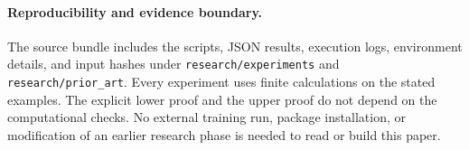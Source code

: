 \paragraph{Reproducibility and evidence boundary.}
The source bundle includes the scripts, JSON results, execution logs,
environment details, and input hashes under
\texttt{research/experiments} and \texttt{research/prior\_art}.
Every experiment uses finite calculations on the stated examples.
The explicit lower proof and the upper proof do not depend on the
computational checks. No external training run, package installation,
or modification of an earlier research phase is needed to read or build
this paper.
